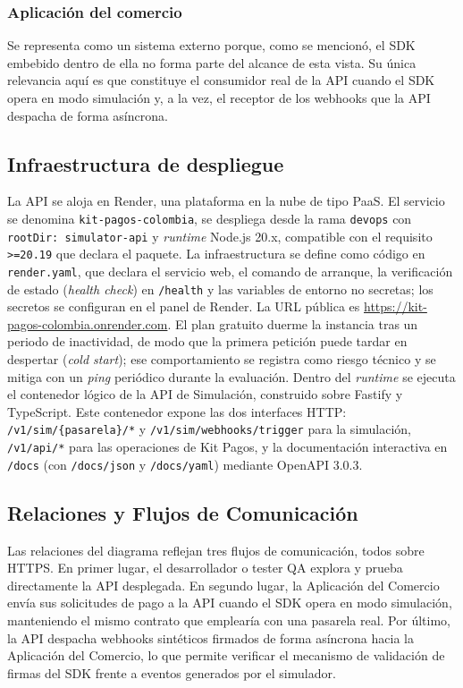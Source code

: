 \subsubsection{Aplicación del comercio}
Se representa como un sistema externo porque, como se mencionó, el SDK embebido dentro de ella no forma parte del alcance de esta vista. Su única relevancia aquí es que constituye el consumidor real de la API cuando el SDK opera en modo simulación y, a la vez, el receptor de los webhooks que la API despacha de forma asíncrona.

\subsection{Infraestructura de despliegue}
La API se aloja en Render, una plataforma en la nube de tipo PaaS. El servicio se denomina \texttt{kit-pagos-colombia}, se despliega desde la rama \texttt{devops} con \texttt{rootDir: simulator-api} y \textit{runtime} Node.js 20.x, compatible con el requisito \texttt{>=20.19} que declara el paquete. La infraestructura se define como código en \texttt{render.yaml}, que declara el servicio web, el comando de arranque, la verificación de estado (\textit{health check}) en \texttt{/health} y las variables de entorno no secretas; los secretos se configuran en el panel de Render. La URL pública es \url{https://kit-pagos-colombia.onrender.com}. El plan gratuito duerme la instancia tras un periodo de inactividad, de modo que la primera petición puede tardar en despertar (\textit{cold start}); ese comportamiento se registra como riesgo técnico y se mitiga con un \textit{ping} periódico durante la evaluación. Dentro del \textit{runtime} se ejecuta el contenedor lógico de la API de Simulación, construido sobre Fastify y TypeScript. Este contenedor expone las dos interfaces HTTP: \texttt{/v1/sim/\{pasarela\}/*} y \texttt{/v1/sim/webhooks/trigger} para la simulación, \texttt{/v1/api/*} para las operaciones de Kit Pagos, y la documentación interactiva en \texttt{/docs} (con \texttt{/docs/json} y \texttt{/docs/yaml}) mediante OpenAPI 3.0.3.

\subsection{Relaciones y Flujos de Comunicación}
Las relaciones del diagrama reflejan tres flujos de comunicación, todos sobre HTTPS. En primer lugar, el desarrollador o tester QA explora y prueba directamente la API desplegada. En segundo lugar, la Aplicación del Comercio envía sus solicitudes de pago a la API cuando el SDK opera en modo simulación, manteniendo el mismo contrato que emplearía con una pasarela real. Por último, la API despacha webhooks sintéticos firmados de forma asíncrona hacia la Aplicación del Comercio, lo que permite verificar el mecanismo de validación de firmas del SDK frente a eventos generados por el simulador.

